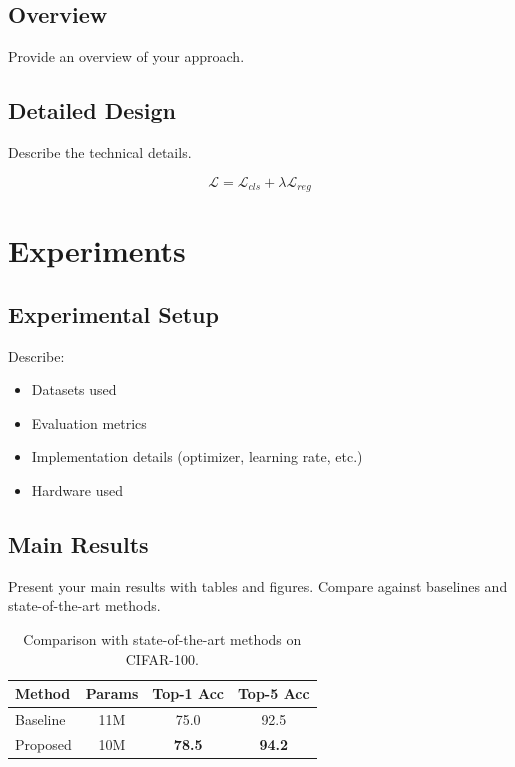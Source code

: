 \documentclass[10pt,twocolumn,letterpaper]{article}
\begin{document}
\subsection{Overview}

Provide an overview of your approach.

\subsection{Detailed Design}

Describe the technical details.

\begin{equation}
    \mathcal{L} = \mathcal{L}_{cls} + \lambda \mathcal{L}_{reg}
\end{equation}

\section{Experiments}
\label{sec:experiments}

\subsection{Experimental Setup}

Describe:
\begin{itemize}
    \item Datasets used
    \item Evaluation metrics
    \item Implementation details (optimizer, learning rate, etc.)
    \item Hardware used
\end{itemize}

\subsection{Main Results}

Present your main results with tables and figures. Compare against baselines and state-of-the-art methods.

\begin{table}[t]
\centering
\caption{Comparison with state-of-the-art methods on CIFAR-100.}
\label{tab:main_results}
\begin{tabular}{lccc}
\toprule
Method & Params & Top-1 Acc & Top-5 Acc \\
\midrule
Baseline & 11M & 75.0 & 92.5 \\
Proposed & 10M & \textbf{78.5} & \textbf{94.2} \\
\bottomrule
\end{tabular}
\end{table}
\end{document}
